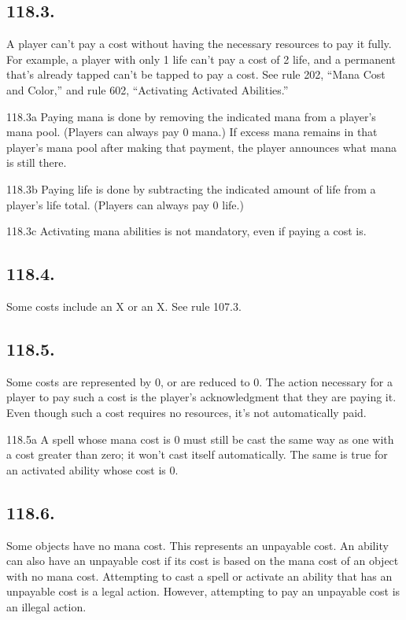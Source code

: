 \subsection*{118.3.}
A player can’t pay a cost without having the necessary resources to pay it fully. For example, a player with only 1 life can’t pay a cost of 2 life, and a permanent that’s already tapped can’t be tapped to pay a cost. See rule 202, “Mana Cost and Color,” and rule 602, “Activating Activated Abilities.”

118.3a Paying mana is done by removing the indicated mana from a player’s mana pool. (Players can always pay 0 mana.) If excess mana remains in that player’s mana pool after making that payment, the player announces what mana is still there.

118.3b Paying life is done by subtracting the indicated amount of life from a player’s life total. (Players can always pay 0 life.)

118.3c Activating mana abilities is not mandatory, even if paying a cost is.

\subsection*{118.4.}
Some costs include an {X} or an X. See rule 107.3.

\subsection*{118.5.}
Some costs are represented by {0}, or are reduced to {0}. The action necessary for a player to pay such a cost is the player’s acknowledgment that they are paying it. Even though such a cost requires no resources, it’s not automatically paid.

118.5a A spell whose mana cost is {0} must still be cast the same way as one with a cost greater than zero; it won’t cast itself automatically. The same is true for an activated ability whose cost is {0}.

\subsection*{118.6.}
Some objects have no mana cost. This represents an unpayable cost. An ability can also have an unpayable cost if its cost is based on the mana cost of an object with no mana cost. Attempting to cast a spell or activate an ability that has an unpayable cost is a legal action. However, attempting to pay an unpayable cost is an illegal action.

